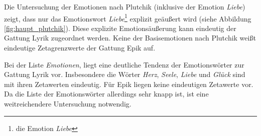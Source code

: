 \documentclass[a4paper,10p]{article}
\begin{document}
Die Untersuchung der Emotionen nach Plutchik (inklusive der Emotion \textit{Liebe}) zeigt, dass nur das Emotionswort \textit{Liebe}\footnote{die Emotion \textit{Liebe}} explizit geäußert wird (siehe Abbildung  \ref{fig:haupt_plutchik}). Diese explizite Emotionsäußerung kann eindeutig der Gattung Lyrik zugeordnet werden. Keine der Basisemotionen nach Plutchik weißt eindeutige Zetagrenzwerte der Gattung Epik auf. \par 

Bei der Liste \textit{Emotionen}, liegt eine deutliche Tendenz der Emotionswörter zur Gattung Lyrik vor. Insbesondere die Wörter \textit{Herz}, \textit{Seele},  \textit{Liebe} und \textit{Glück} sind mit ihren Zetawerten eindeutig. Für Epik liegen keine eindeutigen Zetawerte vor. Da die Liste der Emotionswörter allerdings sehr knapp ist, ist eine weitreichendere Untersuchung notwendig.  \par 
\end{document}
